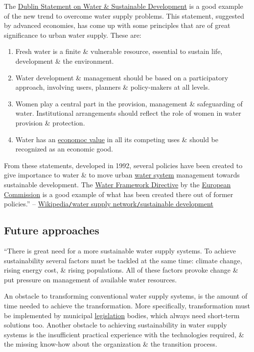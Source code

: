 \documentclass[oneside]{book}
\numberwithin{equation}{section}
\begin{document}
The \href{https://en.wikipedia.org/wiki/Dublin_Statement}{Dublin Statement on Water \& Sustainable Development} is a good example of the new trend to overcome water supply problems. This statement, suggested by advanced economies, has come up with some principles that are of great significance to urban water supply. These are:
\begin{enumerate}
	\item Fresh water is a finite \& vulnerable resource, essential to sustain life, development \& the environment.
	\item Water development \& management should be based on a participatory approach, involving users, planners \& policy-makers at all levels.
	\item Women play a central part in the provision, management \& safeguarding of water. Institutional arrangements should reflect the role of women in water provision \& protection.
	\item Water has an \href{https://en.wikipedia.org/wiki/Economic_value}{economoc value} in all its competing uses \& should be recognized as an economic good.
\end{enumerate}
From these statements, developed in 1992, several policies have been created to give importance to water \& to move urban \href{https://en.wikipedia.org/wiki/Water_system}{water system} management towards sustainable development. The \href{https://en.wikipedia.org/wiki/Water_Framework_Directive}{Water Framework Directive} by the \href{https://en.wikipedia.org/wiki/European_Commission}{European Commission} is a good example of what has been created there out of former policies.'' -- \href{https://en.wikipedia.org/wiki/Water_supply_network#Sustainable_development}{Wikipedia\texttt{/}water supply network\texttt{/}sustainable development}

\subsection{Future approaches}
``There is great need for a more sustainable water supply systems. To achieve sustainability several factors must be tackled at the same time: climate change, rising energy cost, \& rising populations. All of these factors provoke change \& put pressure on management of available water resources.

An obstacle to transforming conventional water supply systems, is the amount of time needed to achieve the transformation. More specifically, transformation must be implemented by municipal \href{https://en.wikipedia.org/wiki/Legislation}{legislation} bodies, which always need short-term solutions too. Another obstacle to achieving sustainability in water supply systems is the insufficient practical experience with the technologies required, \& the missing know-how about the organization \& the transition process.
\end{document}
